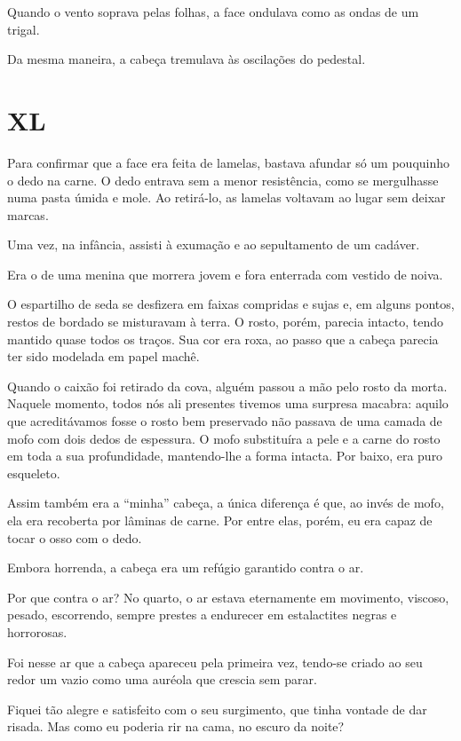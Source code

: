 Quando o vento soprava pelas folhas, a face ondulava como as ondas de um trigal.

Da mesma maneira, a cabeça tremulava às oscilações do pedestal.


\chapter*{\centering\Large{XL}}

Para confirmar que a face era feita de lamelas, bastava afundar só um pouquinho o dedo na carne. O dedo entrava sem a menor resistência, como se mergulhasse numa pasta úmida e mole. Ao retirá-lo, as lamelas voltavam ao lugar sem deixar marcas.

Uma vez, na infância, assisti à exumação e ao sepultamento de um cadáver.

Era o de uma menina que morrera jovem e fora enterrada com vestido de noiva. 

O espartilho de seda se desfizera em faixas compridas e sujas e, em alguns pontos, restos de bordado se misturavam à terra. O rosto, porém, parecia intacto, tendo mantido quase todos os traços. Sua cor era roxa, ao passo que a cabeça parecia ter sido modelada em papel machê.

Quando o caixão foi retirado da cova, alguém passou a mão pelo rosto da morta. Naquele momento, todos nós ali presentes tivemos uma surpresa macabra: aquilo que acreditávamos fosse o rosto bem preservado não passava de uma camada de mofo com dois dedos de espessura. O mofo substituíra a pele e a carne do rosto em toda a sua profundidade, mantendo-lhe a forma intacta. Por baixo, era puro esqueleto.

Assim também era a ``minha'' cabeça, a única diferença é que, ao invés de mofo, ela era recoberta por lâminas de carne. Por entre elas, porém, eu era capaz de tocar o osso com o dedo.

Embora horrenda, a cabeça era um refúgio garantido contra o ar.

Por que contra o ar? No quarto, o ar estava eternamente em movimento, viscoso, pesado, escorrendo, sempre prestes a endurecer em estalactites negras e horrorosas.

Foi nesse ar que a cabeça apareceu pela primeira vez, tendo-se criado ao seu redor um vazio como uma auréola que crescia sem parar.

Fiquei tão alegre e satisfeito com o seu surgimento, que tinha vontade de dar risada. Mas como eu poderia rir na cama, no escuro da noite?

